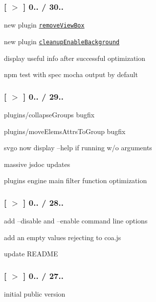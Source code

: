 \subsubsection*{\mbox{[} \href{https://github.com/svg/svgo/tree/v0.0.4}{\tt $>$} \mbox{]} 0.. / 30..}


\begin{DoxyItemize}
\item new plugin \href{plugins/removeViewBox.js}{\tt remove\+View\+Box}
\item new plugin \href{plugins/cleanupEnableBackground.js}{\tt cleanup\+Enable\+Background}
\item display useful info after successful optimization
\item \textquotesingle{}npm test\textquotesingle{} with \textquotesingle{}spec\textquotesingle{} mocha output by default
\end{DoxyItemize}

\subsubsection*{\mbox{[} \href{https://github.com/svg/svgo/tree/v0.0.3}{\tt $>$} \mbox{]} 0.. / 29..}


\begin{DoxyItemize}
\item plugins/collapse\+Groups bugfix
\item plugins/move\+Elems\+Attrs\+To\+Group bugfix
\item svgo now display --help if running w/o arguments
\item massive jsdoc updates
\item plugins engine main filter function optimization
\end{DoxyItemize}

\subsubsection*{\mbox{[} \href{https://github.com/svg/svgo/tree/v0.0.2}{\tt $>$} \mbox{]} 0.. / 28..}


\begin{DoxyItemize}
\item add --disable and --enable command line options
\item add an empty values rejecting to coa.\+js
\item update R\+E\+A\+D\+ME
\end{DoxyItemize}

\subsubsection*{\mbox{[} \href{https://github.com/svg/svgo/tree/v0.0.1}{\tt $>$} \mbox{]} 0.. / 27..}


\begin{DoxyItemize}
\item initial public version 
\end{DoxyItemize}